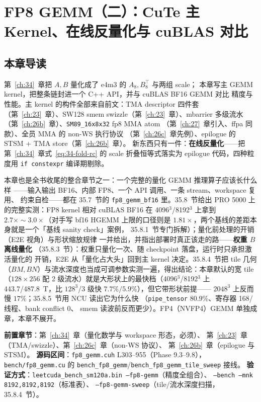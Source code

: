 \chapter{FP8 GEMM（二）：CuTe 主 Kernel、在线反量化与 cuBLAS 对比}\label{ch:35}

\section{本章导读}

第~\ref{ch:34}~章把 $A,B$ 量化成了 e4m3 的 $A_8,B_8^{\top}$ 与两组 scale；
本章写主 GEMM kernel，把整条链封进一个 C++ API，并与 cuBLAS BF16 GEMM 对比
精度与性能。主 kernel 的构件全部来自前文：TMA descriptor 四件套
（第~\ref{ch:23}~章）、SW128 smem swizzle（第~\ref{ch:23}~章）、mbarrier
多级流水（第~\ref{ch:26b}~章）、\texttt{SM89\_16x8x32} fp8 MMA atom
（第~\ref{ch:27}~章引入、ffpa 同款）、全员 MMA 的 non-WS 执行协议
（第~\ref{ch:26c}~章先例）、epilogue 的 STSM + TMA store（第~\ref{ch:26b}~章）。
新东西只有一件：\textbf{在线反量化}——把第~\ref{ch:34}~章式~\ref{eq:34-fold-rc}
的 scale 折叠恒等式落实为 epilogue 代码，四种粒度用 \texttt{if constexpr}
编译期剔除。

本章也是全书收尾的整合章节之一：一个完整的量化 GEMM 推理算子应该长什么样
——输入输出 BF16、内部 FP8、一个 API 调用、一条 stream、workspace 复用、
约束自检——都在 35.7~节的 \texttt{fp8\_gemm\_bf16} 里。35.8~节给出 PRO 5000
上的完整实测：FP8 kernel 相对 cuBLAS BF16 在 4096$^3$/8192$^3$ 上拿到
$2.7\times\sim3.0\times$（对手写 bf16 HGEMM 上限的口径则是
$1.81\times$，两个基线的差距本身就是一个「基线 sanity check」案例，
35.8.1~节专门拆解）；量化前处理的开销（E2E 视角）与形状缩放规律
一并给出，并指出部署时真正该走的路——\textbf{权重 $B$ 离线量化}
（35.8.3~节）：权重只量化一次、随 checkpoint 落盘，运行时只承担激活量化的
开销，E2E 从「量化占大头」回到主 kernel 决定。35.8.4~节把 tile 几何
（$BM,BN$）与流水深度也当成可调参数实测一遍，得出结论：本章默认的宽 tile
（$128\times256$ 配 2 级流水）就是大形状上的最快档（4096$^3$/8192$^3$ 上
443.7/487.8~T，比 $128^3$/3 级快 $7.7\%/5.9\%$），但它带形状前提——
$2048^3$ 上反而慢 $17\%$；35.8.5~节用 NCU 读出它为什么快
（\texttt{pipe\_tensor} 80.9\%、寄存器 168/线程、bank conflict 0、
smem 读波前反而更少）。FP4（NVFP4）GEMM 单独成章，本章不展开。

\textbf{前置章节}：第~\ref{ch:34}~章（量化数学与 workspace 形态，必须）、
第~\ref{ch:23}~章（TMA/swizzle）、第~\ref{ch:26c}~章（non-WS 协议）、
第~\ref{ch:26b}~章（epilogue 与 STSM）。
\textbf{源码区间}：\texttt{fp8\_gemm.cuh} L303--955（Phase 9.3--9.8），
\texttt{bench/fp8\_gemm.cu} 的 \texttt{bench\_fp8\_gemm}/\texttt{bench\_fp8\_gemm\_tile\_sweep}
接线。
\textbf{验证方式}：\texttt{leetcuda\_bench\_sm120a.bin --fp8-gemm}（精度全组合）、
\texttt{--bench --mnk 8192,8192,8192}（标准表）、
\texttt{--fp8-gemm-sweep}（tile/流水深度扫描，35.8.4~节）。

